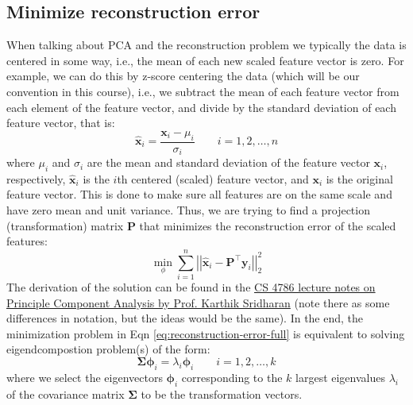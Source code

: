 \documentclass{article}[11pt]
\newcommand{\norm}[1]{\left|\left|#1\right|\right|}
\begin{document}
\subsection*{Minimize reconstruction error}
When talking about PCA and the reconstruction problem we typically the data is centered in some way, i.e., the mean of each new scaled feature vector is zero.
For example, we can do this by z-score centering the data (which will be our convention in this course), i.e., we subtract the mean of each feature vector from each element of the feature vector, and divide by the standard deviation of each feature vector, 
that is:
\begin{equation}
   \hat{\mathbf{x}}_{i} = \frac{\mathbf{x}_{i}-\mu_{i}}{\sigma_{i}}\qquad{i=1,2,\dots,n}
\end{equation}
where $\mu_{i}$ and $\sigma_{i}$ are the mean and standard deviation of the feature vector $\mathbf{x}_{i}$, respectively, $\hat{\mathbf{x}}_{i}$ is the $i$th centered (scaled) feature vector, 
and $\mathbf{x}_{i}$ is the original feature vector. This is done to make sure all features are on the same scale and have zero mean and unit variance.
Thus, we are trying to find a projection (transformation) matrix $\mathbf{P}$ that minimizes the reconstruction error of the scaled features:
\begin{equation}\label{eq:reconstruction-error-full}
   \min_{\phi}\sum_{i=1}^{n}\norm{\hat{\mathbf{x}}_{i}-\mathbf{P}^{\top}\mathbf{y}_{i}}_{2}^{2}
\end{equation}
The derivation of the solution can be found in the \href{https://cornell.box.com/s/uuv2xeoil6pejul3hrdg6hqe96pxruui}{CS 4786 lecture notes on Principle Component Analysis by Prof. Karthik Sridharan} (note there as some differences in notation, but the ideas would be the same).  
In the end, the minimization problem in Eqn \eqref{eq:reconstruction-error-full} is equivalent to solving eigendcompostion problem(s) of the form:
\begin{equation}
\mathbf{\Sigma}\mathbf{\phi}_{i} = \lambda_{i}\mathbf{\phi}_{i}\qquad{i=1,2,\dots,k}
\end{equation}
where we select the eigenvectors $\mathbf{\phi}_{i}$ corresponding to the $k$ largest eigenvalues $\lambda_{i}$ of the covariance matrix $\mathbf{\Sigma}$ to be the transformation vectors.
\end{document}
